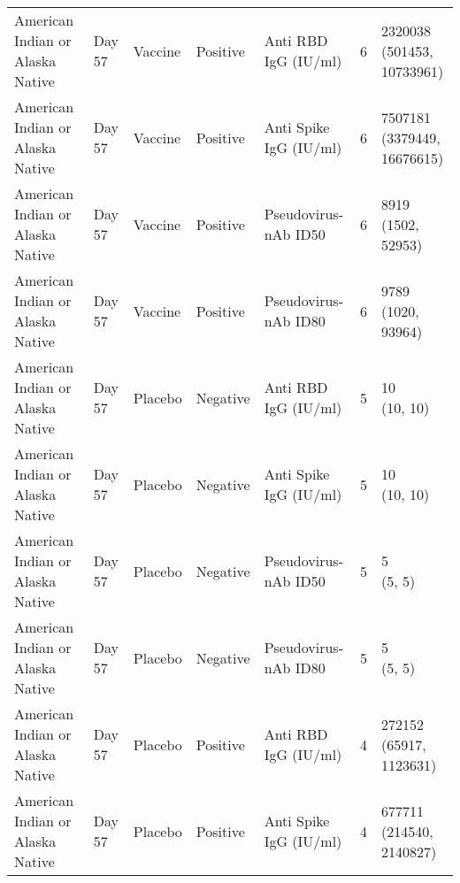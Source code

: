 \documentclass[]{book}
\theoremstyle{definition}
\theoremstyle{definition}
\theoremstyle{definition}
\newcommand{\1}{\mathbbm{1}}
\begin{document}
\begin{landscape}
\begin{ThreePartTable}
\begin{longtable}[t]{>{\raggedright\arraybackslash}p{7cm}llllll}
\hspace{1em}American Indian or Alaska Native & Day 57 & Vaccine & Positive & Anti RBD IgG (IU/ml) & 6 & \makecell[l]{2320038\\(501453, 10733961)}\\
\hspace{1em}American Indian or Alaska Native & Day 57 & Vaccine & Positive & Anti Spike IgG (IU/ml) & 6 & \makecell[l]{7507181\\(3379449, 16676615)}\\
\hspace{1em}American Indian or Alaska Native & Day 57 & Vaccine & Positive & Pseudovirus-nAb ID50 & 6 & \makecell[l]{8919\\(1502, 52953)}\\
\hspace{1em}American Indian or Alaska Native & Day 57 & Vaccine & Positive & Pseudovirus-nAb ID80 & 6 & \makecell[l]{9789\\(1020, 93964)}\\
\hspace{1em}American Indian or Alaska Native & Day 57 & Placebo & Negative & Anti RBD IgG (IU/ml) & 5 & \makecell[l]{10\\(10, 10)}\\
\hspace{1em}American Indian or Alaska Native & Day 57 & Placebo & Negative & Anti Spike IgG (IU/ml) & 5 & \makecell[l]{10\\(10, 10)}\\
\hspace{1em}American Indian or Alaska Native & Day 57 & Placebo & Negative & Pseudovirus-nAb ID50 & 5 & \makecell[l]{5\\(5, 5)}\\
\hspace{1em}American Indian or Alaska Native & Day 57 & Placebo & Negative & Pseudovirus-nAb ID80 & 5 & \makecell[l]{5\\(5, 5)}\\
\hspace{1em}American Indian or Alaska Native & Day 57 & Placebo & Positive & Anti RBD IgG (IU/ml) & 4 & \makecell[l]{272152\\(65917, 1123631)}\\
\hspace{1em}American Indian or Alaska Native & Day 57 & Placebo & Positive & Anti Spike IgG (IU/ml) & 4 & \makecell[l]{677711\\(214540, 2140827)}\\

\end{longtable}
\end{ThreePartTable}
\end{landscape}
\end{document}
